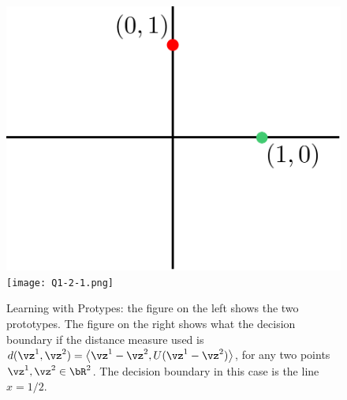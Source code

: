 \documentclass[a4paper,11pt]{article}
\begin{document}
\begin{mlsolution}
\begin{figure}[th]%
\centering
\includegraphics[width=0.3\columnwidth]{proto_blank.png}%
\hfill
\texttt{[image: Q1-2-1.png]}%
\caption{Learning with Protypes: the figure on the left shows the two prototypes. The figure on the right shows what the decision boundary if the distance measure used is $d(\vz^1,\vz^2) =\left \langle \vz^1-\vz^2, U (\vz^1-\vz^2) \right \rangle$, for any two points $\vz^1,\vz^2 \in \bR^2$. The decision boundary in this case is the line $x = 1/2$.}%
\label{fig:proto2}%
\end{figure}

\end{mlsolution}
\end{document}
